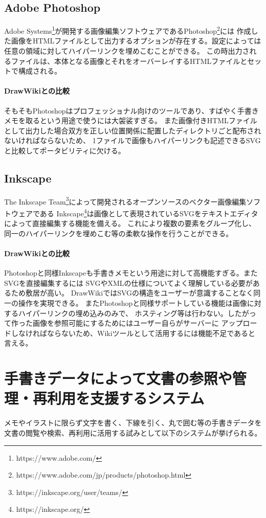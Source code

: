 \subsection{Adobe Photoshop}
Adobe Systems\footnote{https://www.adobe.com/}が開発する画像編集ソフトウェアであるPhotoshop\footnote{https://www.adobe.com/jp/products/photoshop.html}には
作成した画像をHTMLファイルとして出力するオプションが存在する。設定によっては任意の領域に対してハイパーリンクを埋めこむことができる。
この時出力されるファイルは、本体となる画像とそれをオーバーレイするHTMLファイルとセットで構成される。

\paragraph*{DrawWikiとの比較}
そもそもPhotoshopはプロフェッショナル向けのツールであり、すばやく手書きメモを取るという用途で使うには大袈裟すぎる。
また画像付きHTMLファイルとして出力した場合双方を正しい位置関係に配置したディレクトリごと配布されないければならないため、
1ファイルで画像もハイパーリンクも記述できるSVGと比較してポータビリティに欠ける。

\subsection{Inkscape}
The Inkscape Team\footnote{https://inkscape.org/user/teams/}によって開発されるオープンソースのベクター画像編集ソフトウェアである
Inkscape\footnote{https://inkscape.org/}は画像として表現されているSVGをテキストエディタによって直接編集する機能を備える。
これにより複数の要素をグループ化し、同一のハイパーリンクを埋めこむ等の柔軟な操作を行うことができる。

\paragraph*{DrawWikiとの比較}
Photoshopと同様Inkscapeも手書きメモという用途に対して高機能すぎる。またSVGを直接編集するには
SVGやXMLの仕様についてよく理解している必要があるため敷居が高い。
DrawWikiではSVGの構造をユーザーが意識することなく同一の操作を実現できる。
またPhotoshopと同様サポートしている機能は画像に対するハイパーリンクの埋め込みのみで、
ホスティング等は行わない。したがって作った画像を参照可能にするためにはユーザー自らがサーバーに
アップロードしなければならないため、Wikiツールとして活用するには機能不足であると言える。

\section{手書きデータによって文書の参照や管理・再利用を支援するシステム}
メモやイラストに限らず文字を書く、下線を引く、丸で囲む等の手書きデータを
文書の閲覧や検索、再利用に活用する試みとして以下のシステムが挙げられる。

